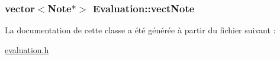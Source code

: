 \hypertarget{class_evaluation_ab235409526456cca10772832104f85f1}{
\subsubsection[{vect\+Note}]{\setlength{\rightskip}{0pt plus 5cm}vector$<${\bf Note}$\ast$$>$ Evaluation\+::vect\+Note\hspace{0.3cm}{\ttfamily [private]}}}\label{class_evaluation_ab235409526456cca10772832104f85f1}


La documentation de cette classe a été générée à partir du fichier suivant \+:\begin{DoxyCompactItemize}
\item 
\hyperlink{evaluation_8h}{evaluation.\+h}\end{DoxyCompactItemize}
